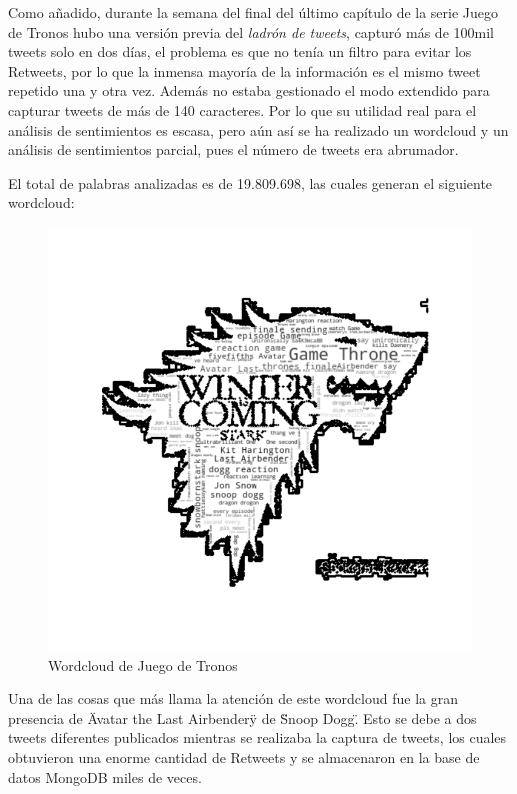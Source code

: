 Como añadido, durante la semana del final del último capítulo de la serie Juego de Tronos hubo una versión previa del \textit{ladrón de tweets}, capturó más de 100mil tweets solo en dos días, el problema es que no tenía un filtro para evitar los Retweets, por lo que la inmensa mayoría de la información es el mismo tweet repetido una y otra vez. Además no estaba gestionado el modo extendido para capturar tweets de más de 140 caracteres. Por lo que su utilidad real para el análisis de sentimientos es escasa, pero aún así se ha realizado un wordcloud y un análisis de sentimientos parcial, pues el número de tweets era abrumador. 



El total de palabras analizadas es de 19.809.698, las cuales generan el siguiente wordcloud:

\begin{figure}[H]
	\centering
	\includegraphics[scale=1]{imagenes/JdTLogo.png}
	\caption{Wordcloud de Juego de Tronos}
	\label{fig:wordcloudJdT}
\end{figure} 

Una de las cosas que más llama la atención de este wordcloud fue la gran presencia de \"Avatar the Last Airbender\" y de \"Snoop Dogg\". Esto se debe a dos tweets diferentes publicados mientras se realizaba la captura de tweets, los cuales obtuvieron una enorme cantidad de Retweets y se almacenaron en la base de datos MongoDB miles de veces. 


